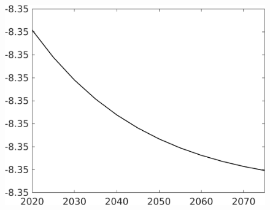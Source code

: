 \documentclass[12pt]{article}
\begin{document}
\begin{figure}[h!!]
\begin{minipage}[]{0.32\textwidth}
\end{minipage}
\begin{minipage}[]{0.32\textwidth}
\includegraphics[width=1\textwidth]{../../codding_model/own_basedOnFried/optimalPol_010922_revision/figures/all_13Sept22/CompTaul_LFBAUPer_Reg0_N_spillover0_nsk0_xgr1_knspil1_sep1_countec0_GovRev0_etaa0.79.png}
\end{minipage}
\end{figure}
\end{document}
